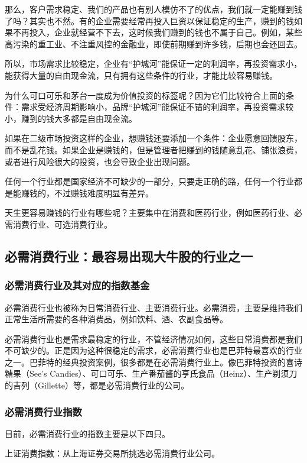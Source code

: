 那么，客户需求稳定、我们的产品也有别人模仿不了的优点，我们就一定能赚到钱了吗？其实也不然。有的企业需要经常再投入巨资以保证稳定的生产，赚到的钱如果不再投入，企业就经营不下去，这时候我们赚到的钱也不属于自己。例如，某些高污染的重工业、不注重风控的金融业，即使前期赚到许多钱，后期也会还回去。

所以，市场需求比较稳定，企业有“护城河”能保证一定的利润率，再投资需求小，能获得大量的自由现金流，只有拥有这些条件的行业，才能比较容易赚钱。

为什么可口可乐和茅台一度成为价值投资的标签呢？因为它们比较符合上面的条件：需求受经济周期影响小，品牌“护城河”能保证不错的利润率，再投资需求较小，赚到的钱大多都是自由现金流。

如果在二级市场投资这样的企业，想赚钱还要添加一个条件：企业愿意回馈股东，而不是乱花钱。如果企业是赚钱的，但是管理者把赚到的钱随意乱花、铺张浪费，或者进行风险很大的投资，也会导致企业出现问题。

任何一个行业都是国家经济不可缺少的一部分，只要走正确的路，任何一个行业都是能赚钱的，不过赚钱难度明显有差异。

天生更容易赚钱的行业有哪些呢？主要集中在消费和医药行业，例如医药行业、必需消费行业、可选消费行业。

\subsection{必需消费行业：最容易出现大牛股的行业之一}
\subsubsection{必需消费行业及其对应的指数基金}

必需消费行业也被称为日常消费行业、主要消费行业。必需消费，主要是维持我们正常生活所需要的各种消费品，例如饮料、酒、农副食品等。

必需消费行业也是需求最稳定的行业，不管经济情况如何，这些日常消费都是我们不可缺少的。正是因为这种很稳定的需求，必需消费行业也是巴菲特最喜欢的行业之一。巴菲特的经典投资案例，很多都是在必需消费行业上。像巴菲特投资的喜诗糖果（See's Candies）、可口可乐、生产番茄酱的亨氏食品（Heinz）、生产剃须刀的吉列（Gillette）等，都是必需消费行业的公司。

\subsubsection{必需消费行业指数}

目前，必需消费行业的指数主要是以下四只。

上证消费指数：从上海证券交易所挑选必需消费行业公司。

